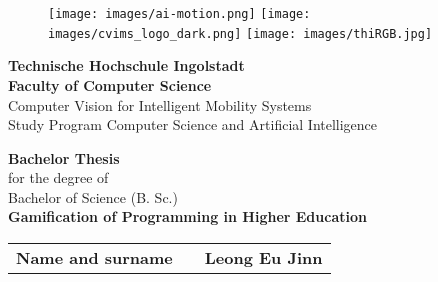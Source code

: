 

\begin{titlepage}	
	\begin{figure}[!h]
		\centering
			\texttt{[image: images/ai-motion.png]}	
			\hfill
			\texttt{[image: images/cvims\_logo\_dark.png]}	
			\hfill
			\texttt{[image: images/thiRGB.jpg]}	
		\end{figure}																			
	
	\begin{center}
		\hrulefill 
	\end{center}
	
	
	\begin{center}	
		\vspace{1cm}
		\huge\textbf{Technische Hochschule Ingolstadt}\\[1em]
		\Large \textbf{Faculty of Computer Science}\\ 
		\normalsize
		Computer Vision for Intelligent Mobility Systems \\ 
		Study Program Computer Science and Artificial Intelligence \\ [2.5em]
	\end{center}


	\begin{center}	
		\vspace{1cm}
		\Large \textbf{Bachelor Thesis}\\ 
		\normalsize
		for the degree of \\ 
		Bachelor of Science (B. Sc.) \\ [3.5em]
		\huge\textbf{Gamification of Programming in Higher Education}	 \\ [3.5em]
	\end{center}



	
	\begin{center}
		\vspace{1cm}
		\hspace{1cm}
		\begin{tabular}{r@{:}ll}
			\textbf{Name and surname} & & \textbf{Leong Eu Jinn}	\\ [3em]
			

\end{tabular}
\end{center}
\end{titlepage}
